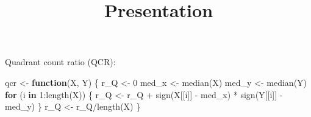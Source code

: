 \documentclass[
]{article}
\title{Presentation}
\author{}
\date{\vspace{-2.5em}}
\newenvironment{Shaded}{\begin{snugshade}}{\end{snugshade}}
\newcommand{\ControlFlowTok}[1]{\textcolor[rgb]{0.13,0.29,0.53}{\textbf{#1}}}
\newcommand{\DecValTok}[1]{\textcolor[rgb]{0.00,0.00,0.81}{#1}}
\newcommand{\FunctionTok}[1]{\textcolor[rgb]{0.00,0.00,0.00}{#1}}
\newcommand{\NormalTok}[1]{#1}
\newcommand{\OtherTok}[1]{\textcolor[rgb]{0.56,0.35,0.01}{#1}}
\newcommand{\SpecialCharTok}[1]{\textcolor[rgb]{0.00,0.00,0.00}{#1}}
\begin{document}
\maketitle

Quadrant count ratio (QCR):

\begin{Shaded}
\begin{Highlighting}[]
\NormalTok{qcr }\OtherTok{\textless{}{-}} \ControlFlowTok{function}\NormalTok{(X, Y) \{}
\NormalTok{    r\_Q }\OtherTok{\textless{}{-}} \DecValTok{0}
\NormalTok{    med\_x }\OtherTok{\textless{}{-}} \FunctionTok{median}\NormalTok{(X)}
\NormalTok{    med\_y }\OtherTok{\textless{}{-}} \FunctionTok{median}\NormalTok{(Y)}
    \ControlFlowTok{for}\NormalTok{ (i }\ControlFlowTok{in} \DecValTok{1}\SpecialCharTok{:}\FunctionTok{length}\NormalTok{(X)) \{}
\NormalTok{        r\_Q }\OtherTok{\textless{}{-}}\NormalTok{ r\_Q }\SpecialCharTok{+} \FunctionTok{sign}\NormalTok{(X[[i]] }\SpecialCharTok{{-}}\NormalTok{ med\_x) }\SpecialCharTok{*} \FunctionTok{sign}\NormalTok{(Y[[i]] }\SpecialCharTok{{-}}\NormalTok{ med\_y)}
\NormalTok{    \}}
\NormalTok{    r\_Q }\OtherTok{\textless{}{-}}\NormalTok{ r\_Q}\SpecialCharTok{/}\FunctionTok{length}\NormalTok{(X)}
\NormalTok{\}}
\end{Highlighting}
\end{Shaded}
\end{document}
